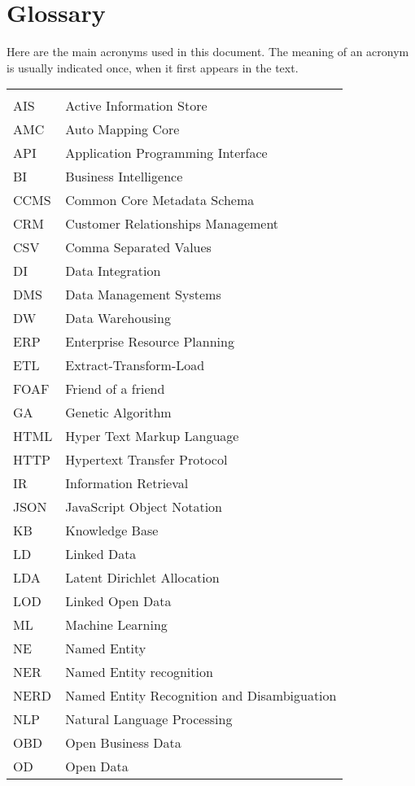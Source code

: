\chapter*{Glossary}

Here are the main acronyms used in this document. The meaning of an acronym is usually indicated once, when it first appears in the text.

\begin{longtable}{lp{9cm}}
 &\\
 AIS & Active Information Store \\
 AMC & Auto Mapping Core \\
 API  &   Application Programming Interface \\
 BI & Business Intelligence\\
 CCMS & Common Core Metadata Schema \\
 CRM & Customer Relationships Management\\
 CSV & Comma Separated Values\\
 DI & Data Integration \\
 DMS & Data Management Systems\\
 DW & Data Warehousing \\
 ERP &  Enterprise Resource Planning\\
 ETL & Extract-Transform-Load \\
 FOAF & Friend of a friend \\
 GA & Genetic Algorithm \\
 HTML &   Hyper Text Markup Language\\
 HTTP & Hypertext Transfer Protocol \\
 IR & Information Retrieval \\
 JSON & JavaScript Object Notation \\
 KB & Knowledge Base \\
 LD & Linked Data\\
 LDA & Latent Dirichlet Allocation \\
 LOD & Linked Open Data \\
 ML & Machine Learning \\
 NE & Named Entity \\
 NER & Named Entity recognition\\
 NERD & Named Entity Recognition and Disambiguation \\
 NLP & Natural Language Processing \\
 OBD & Open Business Data\\
 OD & Open Data\\

\end{longtable}
